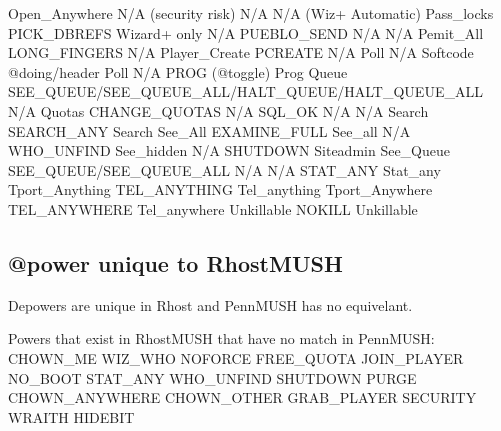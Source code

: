 \documentclass[letterpaper,10pt,english]{sphinxmanual}
\begin{document}
\begin{description}
Open\_Anywhere           N/A (security risk)                                N/A
N/A                     (Wiz+ Automatic)                                   Pass\_locks
PICK\_DBREFS             Wizard+ only                                       N/A
PUEBLO\_SEND             N/A                                                N/A
Pemit\_All               LONG\_FINGERS                                       N/A
Player\_Create           PCREATE                                            N/A
Poll                    N/A \textendash{} Softcode @doing/header                      Poll
N/A                     PROG (@toggle)                                     Prog
Queue                   SEE\_QUEUE/SEE\_QUEUE\_ALL/HALT\_QUEUE/HALT\_QUEUE\_ALL  N/A
Quotas                  CHANGE\_QUOTAS                                      N/A
SQL\_OK                  N/A                                                N/A
Search                  SEARCH\_ANY                                         Search
See\_All                 EXAMINE\_FULL                                       See\_all
N/A                     WHO\_UNFIND                                         See\_hidden
N/A                     SHUTDOWN                                           Siteadmin
See\_Queue               SEE\_QUEUE/SEE\_QUEUE\_ALL                            N/A
N/A                     STAT\_ANY                                           Stat\_any
Tport\_Anything          TEL\_ANYTHING                                       Tel\_anything
Tport\_Anywhere          TEL\_ANYWHERE                                       Tel\_anywhere
Unkillable              NOKILL                                             Unkillable

\end{description}


\subsection{@power unique to RhostMUSH}
\label{\detokenize{differences:power-unique-to-rhostmush}}
\sphinxAtStartPar
Depowers are unique in Rhost and PennMUSH has no equivelant.

\sphinxAtStartPar
Powers that exist in RhostMUSH that have no match in PennMUSH:
CHOWN\_ME                     WIZ\_WHO                       NOFORCE
FREE\_QUOTA                   JOIN\_PLAYER                   NO\_BOOT
STAT\_ANY                     WHO\_UNFIND                    SHUTDOWN
PURGE                        CHOWN\_ANYWHERE                CHOWN\_OTHER
GRAB\_PLAYER                  SECURITY                      WRAITH
HIDEBIT
\end{document}
